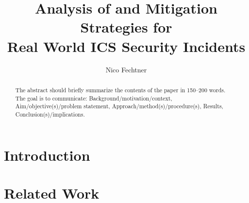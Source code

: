 \documentclass[runningheads]{llncs}
\begin{document}
%
\title{Analysis of and Mitigation Strategies for \\Real World ICS Security Incidents}
%
%
\author{Nico Fechtner}
%
%
%
\maketitle              %
%
\begin{abstract}
The abstract should briefly summarize the contents of the paper in
150--200 words.
The goal is to communicate: Background/motivation/context, Aim/objective(s)/problem statement, Approach/method(s)/procedure(s), Results, Conclusion(s)/implications.

\end{abstract}
%
%
%

\section{Introduction}
\section{Related Work}
\end{document}
